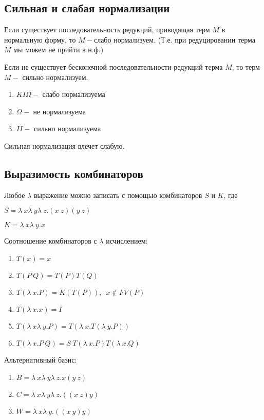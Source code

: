 	\subsection{Сильная и слабая нормализации}
	\begin{definition}Если существует последовательность редукций, приводящая терм $M$ в нормальную форму, то $M-$слабо нормализуем. (Т.е. при редуцировании терма $M$ мы можем не прийти в н.ф.)\end{definition} 
	\begin{definition}Если не существует бесконечной последовательности редукций терма $M$, то терм $M-$ сильно нормализуем.\end{definition} 
	 \begin{statement}
	 \end{statement}
	 \begin{enumerate}
	 	\item $KI\Omega-$ слабо нормализуема
	 	\item $\Omega-$ не нормализуема
	 	\item $II-$ сильно нормализуема
	 \end{enumerate}
	 \begin{lemma}Сильная нормализация влечет слабую.
	 \end{lemma}
	 \subsection{Выразимость комбинаторов}
	 \begin{statement}Любое $\lambda$ выражение можно записать с помощью комбинаторов $S$ и $K$, где\end{statement}
	 $S=\lambda\:x\lambda\:y\lambda\:z.(x\:z)(y\:z)$\par 
	 $K=\lambda\:x\lambda\:y.x$\par 
	\begin{statement}Соотношение комбинаторов с $\lambda$ исчислением:\end{statement}
	\begin{enumerate}
		\item $T(x)=x$
		\item $T(P\:Q)=T(P)T(Q)$
		\item $T(\lambda\:x.P)=K(T(P)),\enspace x\not\in FV(P)$
		\item $T(\lambda\:x.x)=I$
		\item $T(\lambda\:x\lambda\:y.P)=T(\lambda\:x.T(\lambda\:y.P))$
		\item $T(\lambda\:x.P\:Q)=S\:T(\lambda\:x.P)T(\lambda\:x.Q)$
	\end{enumerate}		
	 \begin{statement}Альтернативный базис:\end{statement}
	 \begin{enumerate}
		\item $B=\lambda\:x\lambda\:y\lambda\:z.x(y\:z)$
		\item $C=\lambda\:x\lambda\:y\lambda\:z.((x\:z)y)$
		\item $W=\lambda\:x\lambda\:y.((x\:y)y)$
	 \end{enumerate}
